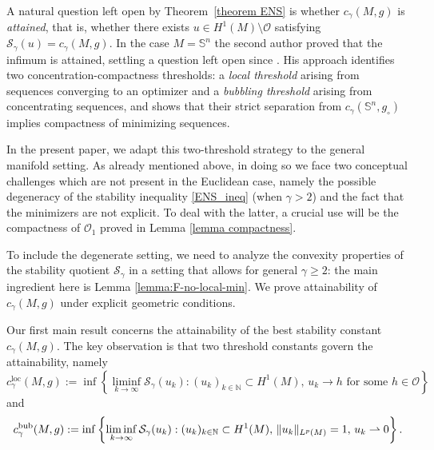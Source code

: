 \documentclass[reqno,11pt]{amsart}
\numberwithin{equation}{section}
\theoremstyle{definition}
\theoremstyle{remark}
\newcommand{\Ss}{\mathbb{S}}
\begin{document}
A natural question left open by Theorem~\ref{theorem ENS} is whether $c_{\gamma}(M,g)$ 
is \emph{attained}, that is, whether there exists $u \in H^1(M) \setminus \mathscr{O}$ 
satisfying $\mathcal{S}_\gamma(u) = c_{\gamma}(M,g)$. In the case $M = \Ss^n$ 
the second author \cite{arXiv:2211.14185} proved that the infimum is attained, settling a question left 
open since \cite{BE}. His approach identifies two concentration-compactness thresholds:
a \emph{local threshold} arising from sequences converging to an optimizer and a \emph{bubbling 
threshold} arising from concentrating sequences, and shows that their strict separation 
from $c_{\gamma}(\Ss^n, g_\circ)$ implies compactness of minimizing sequences.

In the present paper, we adapt this two-threshold strategy to the general manifold 
setting. As already mentioned above, in doing so we face two conceptual 
challenges which are not present in the Euclidean case, namely the possible degeneracy 
of the stability inequality \eqref{ENS_ineq} (when $\gamma > 2$) and the fact that the 
minimizers are not explicit. To deal with the latter, a crucial use will be the compactness 
of $\mathcal O_1$ proved in Lemma \ref{lemma compactness}.

To include the degenerate setting, 
we need to analyze the convexity properties of the stability quotient $\mathcal S_\gamma$ in 
a setting that allows for general $\gamma \geqslant 2$: the main ingredient here is Lemma \ref{lemma:F-no-local-min}. 
We prove attainability of $c_{\gamma}(M,g)$ under explicit geometric conditions. 

\medskip
{}
Our first main result concerns the attainability of the best stability constant $c_{\gamma}(M,g)$. 
The key observation is that two threshold constants govern the attainability, namely
\begin{equation}\label{eq:stability_constant_loc}
c_{\gamma}^{\mathrm{loc}}(M,g):= \inf \left\{ \liminf_{k \to \infty} 
\mathcal{S}_\gamma(u_k) : (u_k)_{k \in \mathbb{N}} \subset H^1(M),\, u_k \to h 
\text{ for some } h \in \mathscr{O} \right\}
\end{equation}
and
\begin{equation}\label{eq:stability_constant_bubble}
c_{\gamma}^{\rm bub}(M,g) := \inf \left\{ \liminf_{k \to \infty} 
\mathcal{S}_\gamma(u_k) : (u_k)_{k \in \mathbb{N}} \subset H^1(M),\, \|u_k\|_{L^p(M)} = 1,
\, u_k \rightharpoonup 0 \right\}.
\end{equation}
\end{document}
